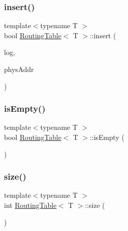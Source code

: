 \mbox{\label{classRoutingTable_a6732eb52fc45bc6ae93047b87f4726fe}} 
\subsubsection{\texorpdfstring{insert()}{insert()}}
{\footnotesize\ttfamily template$<$typename T $>$ \\
bool \hyperlink{classRoutingTable}{Routing\+Table}$<$ T $>$\+::insert (\begin{DoxyParamCaption}\item[{\hyperlink{structLogicalAddress}{Logical\+Address}}]{log,  }\item[{T}]{phys\+Addr }\end{DoxyParamCaption})\hspace{0.3cm}{\ttfamily [inline]}}

\mbox{\label{classRoutingTable_acdeee42f79a685483bc6e8ba5014de42}} 
\subsubsection{\texorpdfstring{is\+Empty()}{isEmpty()}}
{\footnotesize\ttfamily template$<$typename T $>$ \\
bool \hyperlink{classRoutingTable}{Routing\+Table}$<$ T $>$\+::is\+Empty (\begin{DoxyParamCaption}{ }\end{DoxyParamCaption})\hspace{0.3cm}{\ttfamily [inline]}}

\mbox{\label{classRoutingTable_a171f5d7e7f84b4415eae14f2161fc2e9}} 
\subsubsection{\texorpdfstring{size()}{size()}}
{\footnotesize\ttfamily template$<$typename T $>$ \\
int \hyperlink{classRoutingTable}{Routing\+Table}$<$ T $>$\+::size (\begin{DoxyParamCaption}{ }\end{DoxyParamCaption})\hspace{0.3cm}{\ttfamily [inline]}}



